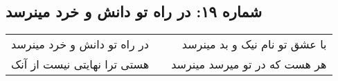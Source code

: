\begin{center}
\section*{شماره ۱۹: در راه تو دانش و خرد مینرسد}
\label{sec:019}
\begin{longtable}{l p{0.5cm} r}
در راه تو دانش و خرد مینرسد
&&
با عشق تو نام نیک و بد مینرسد
\\
هستی ترا نهایتی نیست از آنک
&&
هر هست که در تو میرسد مینرسد
\\
\end{longtable}
\end{center}
